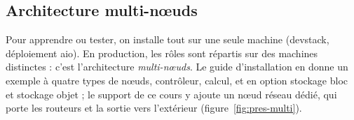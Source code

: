 \subsection{Architecture multi-nœuds}\label{sec:pres-multinoeuds}

Pour apprendre ou tester, on installe tout sur une seule machine (\gls{devstack}, déploiement \gls{aio}). En production, les rôles sont
répartis sur des machines distinctes : c'est l'architecture \emph{multi-nœuds}. Le guide d'installation en donne un exemple à quatre
types de nœuds, contrôleur, calcul, et en option stockage bloc et stockage objet \parencite{install-overview} ; le support de ce
cours y ajoute un nœud réseau dédié, qui porte les routeurs et la sortie vers l'extérieur (figure~\ref{fig:pres-multi}).


